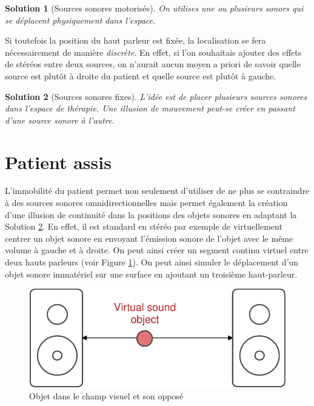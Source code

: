 \documentclass[french]{article}
\newtheorem{sol}{Solution}
\begin{document}
\begin{sol}[Sources sonores motorisés]
	On utilises une ou plusieurs sonors qui se déplacent physiquement dans l'espace.
\end{sol}

Si toutefois la position du haut parleur est fixée, la localisation se fera nécessairement de manière \emph{discrète}. En effet, si l'on souhaitais ajouter  des effets de stéréos entre deux sources,  on n'aurait aucun moyen a priori de savoir quelle source est plutôt à droite du patient et quelle source est plutôt à gauche. 

\begin{sol}[Sources sonores fixes]
	\label{solSrcFixe}
	L'idée est de placer plusieurs sources sonores dans l'espace de thérapie. Une illusion de mouvement peut-se créer en passant d'une source sonore à l'autre.
\end{sol}

\section{Patient assis}

L'immobilité du patient permet non seulement d'utiliser de ne plus se contraindre à des sources sonores omnidirectionnelles mais permet également la création d'une illusion de continuité dans la positions des objets sonores en adaptant la Solution \ref{solSrcFixe}. En effet, il est standard en stéréo par exemple de virtuellement centrer un objet sonore en envoyant l'émission sonore de l'objet avec le même volume à gauche et à droite. On peut ainsi créer un segment continu virtuel entre deux hauts parleurs (voir Figure \ref{stereo-localization}). On peut ainsi simuler le déplacement d'un objet sonore immatériel sur une surface en ajoutant un troisième haut-parleur.

\begin{figure}[!h]
	\centering
	\includegraphics[scale = 0.7]{schemas/stereo-localization.pdf}
	\caption{Objet dans le champ visuel et son opposé}
	\label{stereo-localization}
\end{figure}
\end{document}
